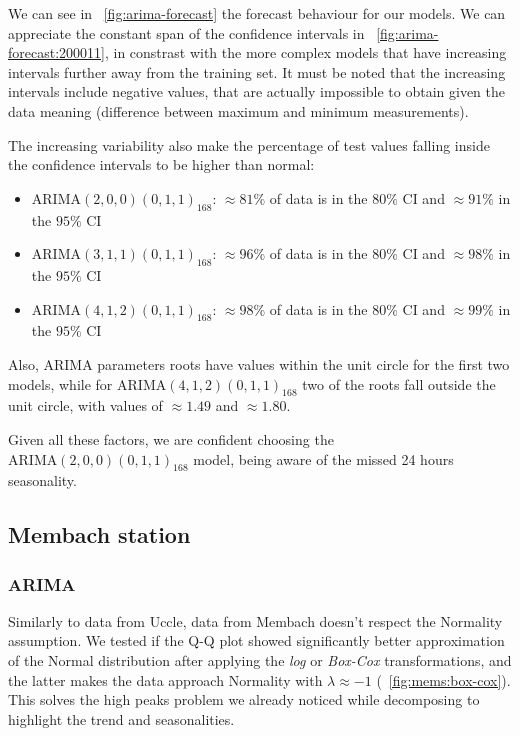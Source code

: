 \documentclass[12pt]{article}
\begin{document}
We can see in \figurename~\ref{fig:arima-forecast} the forecast behaviour for our models. We can appreciate the constant span of the confidence intervals in \figurename~\ref{fig:arima-forecast:200011}, in constrast with the more complex models that have increasing intervals further away from the training set. It must be noted that the increasing intervals include negative values, that are actually impossible to obtain given the data meaning (difference between maximum and minimum measurements).

The increasing variability also make the percentage of test values falling inside the confidence intervals to be higher than normal:
\begin{itemize}[topsep=0.5em,itemsep=0em,partopsep=0.5em]
	\item $\mathrm{ARIMA}(2,0,0)(0,1,1)_{168}$: $\approx81\%$ of data is in the $80\%$ CI and $\approx91\%$ in the $95\%$ CI
	\item $\mathrm{ARIMA}(3,1,1)(0,1,1)_{168}$: $\approx96\%$ of data is in the $80\%$ CI and $\approx98\%$ in the $95\%$ CI
	\item $\mathrm{ARIMA}(4,1,2)(0,1,1)_{168}$: $\approx98\%$ of data is in the $80\%$ CI and $\approx99\%$ in the $95\%$ CI
\end{itemize}

Also, ARIMA parameters roots have values within the unit circle for the first two models, while for $\mathrm{ARIMA}(4,1,2)(0,1,1)_{168}$ two of the roots fall outside the unit circle, with values of $\approx1.49$ and $\approx1.80$.

Given all these factors, we are confident choosing the $\mathrm{ARIMA}(2,0,0)(0,1,1)_{168}$ model, being aware of the missed 24 hours seasonality.


\subsection{Membach station}
\subsubsection{ARIMA}
Similarly to data from Uccle, data from Membach doesn't respect the Normality assumption. We tested if the Q-Q plot showed significantly better approximation of the Normal distribution after applying the \textit{log} or \textit{Box-Cox} transformations, and the latter makes the data approach Normality with $\lambda\approx-1$ (\figurename~\ref{fig:mems:box-cox}). This solves the high peaks problem we already noticed while decomposing to highlight the trend and seasonalities.
\end{document}
